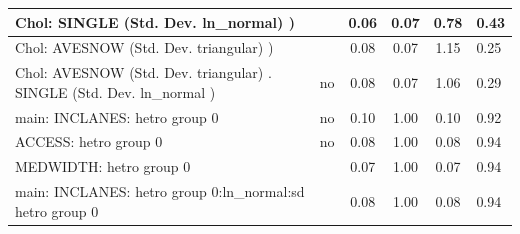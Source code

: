 \begin{table}
\begin{center}
\begin{tabular}{|l|l|c|c|c|l|}
			\hline
			 Chol: SINGLE (Std. Dev. ln_normal) ) &  & 0.06 & 0.07 & 0.78 & 0.43 \\
			\hline
			 Chol: AVESNOW (Std. Dev. triangular) ) &  & 0.08 & 0.07 & 1.15 & 0.25 \\
			\hline
			 Chol: AVESNOW (Std. Dev. triangular) . SINGLE (Std. Dev.   ln_normal ) & no & 0.08 & 0.07 & 1.06 & 0.29 \\
			\hline
			main: INCLANES: hetro group 0 & no & 0.10 & 1.00 & 0.10 & 0.92 \\
			\hline
			ACCESS: hetro group 0 & no & 0.08 & 1.00 & 0.08 & 0.94 \\
			\hline
			MEDWIDTH: hetro group 0 &  & 0.07 & 1.00 & 0.07 & 0.94 \\
			\hline
			main: INCLANES: hetro group 0:ln_normal:sd  hetro group 0 &  & 0.08 & 1.00 & 0.08 & 0.94 \\
			\hline
		\end{tabular}
	\end{center}
\end{table}